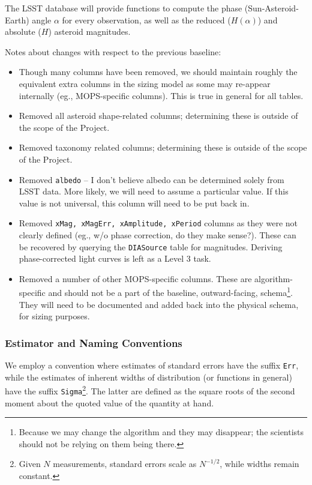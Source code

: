 \documentclass[12pt]{article}
\newcommand{\code}[1]{\texttt{#1}}
\newcommand{\DIASource}{\code{DIASource}\xspace}
\begin{document}
The LSST database will provide functions to compute the phase (Sun-Asteroid-Earth) angle $\alpha$ for every observation, as well as the reduced ($H(\alpha)$) and absolute ($H$) asteroid magnitudes.

\begin{changelog}
Notes about changes with respect to the previous baseline:
\begin{itemize}
\item Though many columns have been removed, we should maintain roughly the equivalent extra columns in the sizing model as some may re-appear internally (eg., MOPS-specific columns). This is true in general for all tables.
\item Removed all asteroid shape-related columns; determining these is outside of the scope of the Project.
\item Removed taxonomy related columns; determining these is outside of the scope of the Project.
\item Removed \texttt{albedo} -- I don't believe albedo can be determined solely from LSST data. More likely, we will need to assume a particular value. If this value is not universal, this column will need to be put back in.
\item Removed \texttt{xMag, xMagErr, xAmplitude, xPeriod} columns as they were not clearly defined (eg., w/o phase correction, do they make sense?). These can be recovered by querying the \DIASource table for magnitudes. Deriving phase-corrected light curves is left as a Level 3 task.
\item Removed a number of other MOPS-specific columns. These are algorithm-specific and should not be a part of the baseline, outward-facing, schema\footnote{Because we may change the algorithm and they may disappear; the scientists should not be relying on them being there.}. They will need to be documented and added back into the physical schema, for sizing purposes.
\end{itemize}
\end{changelog}

\subsubsection{Estimator and Naming Conventions}

We employ a convention where estimates of standard errors have the suffix {\tt Err}, while the estimates of inherent widths of distribution (or functions in general) have the suffix {\tt Sigma}\footnote{Given $N$ measurements, standard errors scale as $N^{-1/2}$, while widths remain constant.}. The latter are defined as the square roots of the second moment about the quoted value of the quantity at hand.
\end{document}
